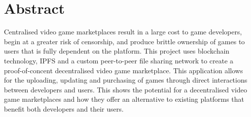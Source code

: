 \section*{Abstract}

Centralised video game marketplaces result in a large cost to game developers, begin at a greater risk of censorship, and produce brittle ownership of games to users that is fully dependent on the platform. 
\x
This project uses blockchain technology, IPFS and a custom peer-to-peer file sharing network to create a proof-of-concent decentralised video game marketplace. This application allows for the uploading, updating and purchasing of games through direct interactions between developers and users. 
\x
This shows the potential for a decentralised video game marketplaces and how they offer an alternative to existing platforms that benefit both developers and their users.